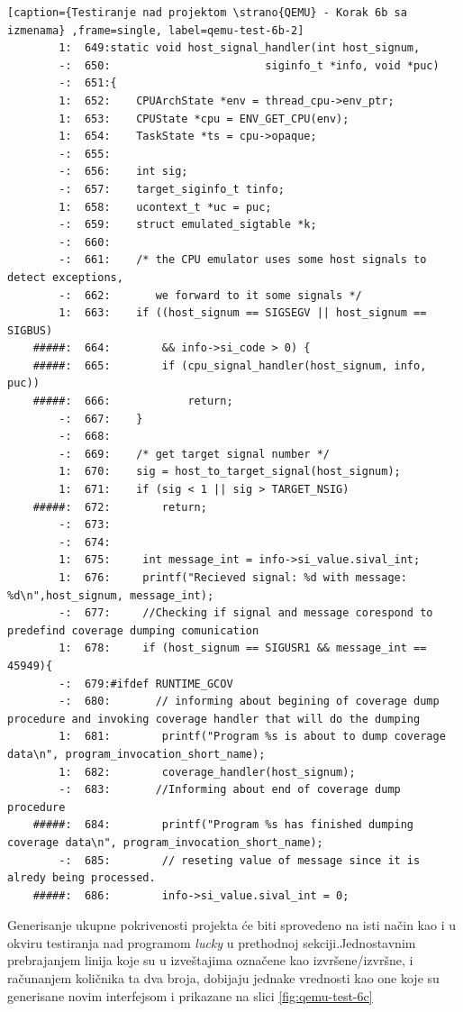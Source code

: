 \documentclass[12pt,oneside]{memoir}
\newcommand{\strano}[1]{\textit{#1}}
\begin{document}
\begin{lstlisting}[caption={Testiranje nad projektom \strano{QEMU} - Korak 6b sa izmenama} ,frame=single, label=qemu-test-6b-2]
        1:  649:static void host_signal_handler(int host_signum,
        -:  650:                        siginfo_t *info, void *puc)
        -:  651:{
        1:  652:    CPUArchState *env = thread_cpu->env_ptr;
        1:  653:    CPUState *cpu = ENV_GET_CPU(env);
        1:  654:    TaskState *ts = cpu->opaque;
        -:  655:
        -:  656:    int sig;
        -:  657:    target_siginfo_t tinfo;
        1:  658:    ucontext_t *uc = puc;
        -:  659:    struct emulated_sigtable *k;
        -:  660:
        -:  661:    /* the CPU emulator uses some host signals to detect exceptions,
        -:  662:       we forward to it some signals */
        1:  663:    if ((host_signum == SIGSEGV || host_signum == SIGBUS)
    #####:  664:        && info->si_code > 0) {
    #####:  665:        if (cpu_signal_handler(host_signum, info, puc))
    #####:  666:            return;
        -:  667:    }
        -:  668:
        -:  669:    /* get target signal number */
        1:  670:    sig = host_to_target_signal(host_signum);
        1:  671:    if (sig < 1 || sig > TARGET_NSIG)
    #####:  672:        return;
        -:  673:
        -:  674:
        1:  675:     int message_int = info->si_value.sival_int;
        1:  676:     printf("Recieved signal: %d with message: %d\n",host_signum, message_int);
        -:  677:     //Checking if signal and message corespond to predefind coverage dumping comunication
        1:  678:     if (host_signum == SIGUSR1 && message_int == 45949){
        -:  679:#ifdef RUNTIME_GCOV
        -:  680:       // informing about begining of coverage dump procedure and invoking coverage handler that will do the dumping
        1:  681:        printf("Program %s is about to dump coverage data\n", program_invocation_short_name);
        1:  682:        coverage_handler(host_signum);
        -:  683:       //Informing about end of coverage dump procedure
    #####:  684:        printf("Program %s has finished dumping coverage data\n", program_invocation_short_name);
        -:  685:        // reseting value of message since it is alredy being processed.
    #####:  686:        info->si_value.sival_int = 0;
\end{lstlisting}

Generisanje ukupne pokrivenosti projekta će biti sprovedeno na isti način kao i u okviru testiranja nad programom \strano{lucky} u prethodnoj sekciji.Jednostavnim prebrajanjem linija koje su u izveštajima označene kao izvršene/izvršne, i računanjem količnika ta dva broja, dobijaju jednake vrednosti kao one koje su generisane novim interfejsom i prikazane na slici \ref{fig:qemu-test-6c}
\end{document}
